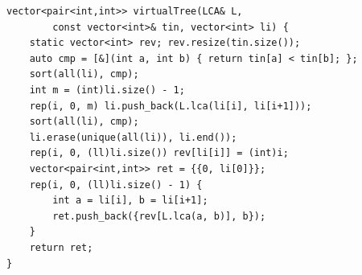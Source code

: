 \begin{lstlisting}
vector<pair<int,int>> virtualTree(LCA& L,
        const vector<int>& tin, vector<int> li) {
    static vector<int> rev; rev.resize(tin.size());
    auto cmp = [&](int a, int b) { return tin[a] < tin[b]; };
    sort(all(li), cmp);
    int m = (int)li.size() - 1;
    rep(i, 0, m) li.push_back(L.lca(li[i], li[i+1]));
    sort(all(li), cmp);
    li.erase(unique(all(li)), li.end());
    rep(i, 0, (ll)li.size()) rev[li[i]] = (int)i;
    vector<pair<int,int>> ret = {{0, li[0]}};
    rep(i, 0, (ll)li.size() - 1) {
        int a = li[i], b = li[i+1];
        ret.push_back({rev[L.lca(a, b)], b});
    }
    return ret;
}
\end{lstlisting}
